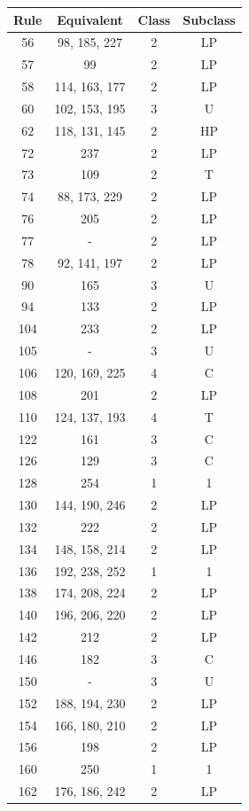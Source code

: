 \begin{table}
\begin{tabular}{|c|c|c|c}
        Rule & Equivalent & Class & Subclass \\
        \hline
        56 & 98, 185, 227 & 2 & LP \\
        57 & 99 & 2 & LP \\
        58 & 114, 163, 177 & 2 & LP \\
        60 & 102, 153, 195 & 3 & U \\
        62 & 118, 131, 145 & 2 & HP \\
        72 & 237 & 2 & LP \\
        73 & 109 & 2 & T \\
        74 & 88, 173, 229 & 2 & LP \\
        76 & 205 & 2 & LP \\
        77 & - & 2 & LP \\
        78 & 92, 141, 197 & 2 & LP \\
        90 & 165 & 3 & U \\
        94 & 133 & 2 & LP \\
        104 & 233 & 2 & LP \\
        105 & - & 3 & U \\
        106 & 120, 169, 225 & 4 & C \\
        108 & 201 & 2 & LP \\
        110 & 124, 137, 193 & 4 & T \\
        122 & 161 & 3 & C \\
        126 & 129 & 3 & C \\
        128 & 254 & 1 & 1 \\
        130 & 144, 190, 246 & 2 & LP \\
        132 & 222 & 2 & LP \\
        134 & 148, 158, 214 & 2 & LP \\
        136 & 192, 238, 252 & 1 & 1 \\
        138 & 174, 208, 224 & 2 & LP \\
        140 & 196, 206, 220 & 2 & LP \\
        142 & 212 & 2 & LP \\
        146 & 182 & 3 & C \\
        150 & - & 3 & U \\
        152 & 188, 194, 230 & 2 & LP \\
        154 & 166, 180, 210 & 2 & LP \\
        156 & 198 & 2 & LP \\
        160 & 250 & 1 & 1 \\
        162 & 176, 186, 242 & 2 & LP \\

\end{tabular}
\end{table}
